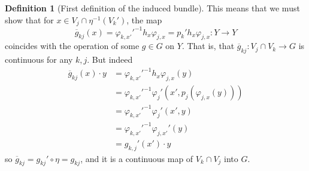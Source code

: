 \documentclass[reqno]{amsart}
\theoremstyle{definition}
\newtheorem{definition}[theorem]{Definition}
\theoremstyle{remark}
\begin{document}
\begin{definition}[First definition of the induced bundle]
        This means that we must show that
        for
        $x \in V_j \cap \eta^{-1}(V_k')$, the map
        \[
        \overline{g}_{kj}(x) =
        \varphi_{k,x'}'^{-1} h_x \varphi_{j,x} = 
        p_k' h_x \varphi_{j,x} \colon Y \to Y
        \] 
        coincides with the operation of some $g \in G$
        on $Y$. That is, that 
        $\overline{g}_{kj} \colon
        V_{j} \cap V_{k} \to G$ is continuous for any
        $k,j$.
        But indeed
        \begin{align*}
            \overline{g}_{kj}(x)\cdot y
            &= \varphi_{k,x'}'^{-1} h_x \varphi_{j,x}(y)\\
            &= 
            \varphi_{k,x'}'^{-1} 
            \varphi_j' \left( x',
            p_j \left( \varphi_{j,x}(y) \right)  \right) \\
            &= \varphi_{k,x'}'^{-1} 
            \varphi_{j}' \left( x', y \right) \\
            &= \varphi_{k,x'}'^{-1} \varphi_{j,x'}'(y)\\
            &= g_{k,j}' (x') \cdot y
        \end{align*}
        so $\overline{g}_{kj} =
        g_{kj}' \circ \eta = g_{kj}$, and it is
        a continuous map of
        $V_{k} \cap V_j $ into $G$.
        
    \end{definition}
\end{document}
